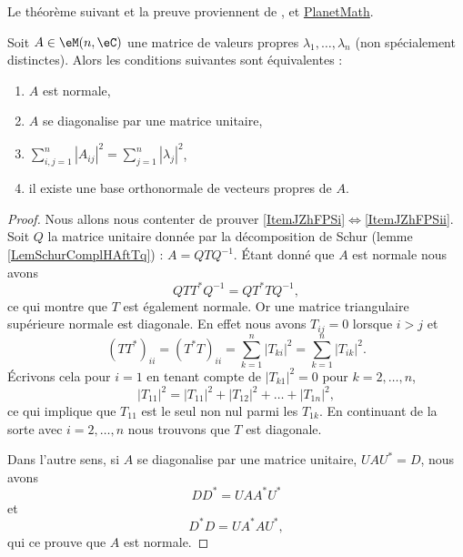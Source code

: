Le théorème suivant et la preuve proviennent de \cite{LecLinAlgAllen},  et \href{http://planetmath.org/encyclopedia/TheoremForNormalTriangularMatrices.html}{PlanetMath}.
\begin{theorem}    \label{ThogammwA}
    Soit \( A\in\eM(n,\eC)\) une matrice de valeurs propres \( \lambda_1,\ldots, \lambda_n\) (non spécialement distinctes). Alors les conditions suivantes sont équivalentes :
    \begin{enumerate}
        \item   \label{ItemJZhFPSi}
            \( A\) est normale,
        \item   \label{ItemJZhFPSii}
            \( A\) se diagonalise par une matrice unitaire,
        \item
            \( \sum_{i,j=1}^n| A_{ij} |^2=\sum_{j=1}^n| \lambda_j |^2\),
        \item
            il existe une base orthonormale de vecteurs propres de \( A\).
    \end{enumerate}
\end{theorem}

\begin{proof}
    Nous allons nous contenter de prouver \ref{ItemJZhFPSi}\( \Leftrightarrow\)\ref{ItemJZhFPSii}. Soit \( Q\) la matrice unitaire donnée par la décomposition de Schur (lemme \ref{LemSchurComplHAftTq}) : \( A=QTQ^{-1}\). Étant donné que \( A\) est normale nous avons
    \begin{equation}
        QTT^*Q^{-1}=QT^*TQ^{-1},
    \end{equation}
    ce qui montre que \( T\) est également normale. Or une matrice triangulaire supérieure normale est diagonale. En effet nous avons \( T_{ij}=0\) lorsque \( i>j\) et
    \begin{equation}
        (TT^*)_{ii}=(T^*T)_{ii}=\sum_{k=1}^n| T_{ki} |^2=\sum_{k=1}^n| T_{ik} |^2.
    \end{equation}
    Écrivons cela pour \( i=1\) en tenant compte de \( | T_{k1} |^2=0\) pour \( k=2,\ldots, n\),
    \begin{equation}
        | T_{11} |^2=| T_{11} |^2+| T_{12} |^2+\ldots+| T_{1n} |^2,
    \end{equation}
    ce qui implique que \( T_{11}\) est le seul non nul parmi les \( T_{1k}\). En continuant de la sorte avec \( i=2,\ldots, n\) nous trouvons que \( T\) est diagonale.

    Dans l'autre sens, si \( A\) se diagonalise par une matrice unitaire, \( UAU^*=D\), nous avons
    \begin{equation}
        DD^*=UAA^*U^*
    \end{equation}
    et 
    \begin{equation}
        D^*D=UA^*AU^*,
    \end{equation}
    qui ce prouve que \( A\) est normale.
\end{proof}

